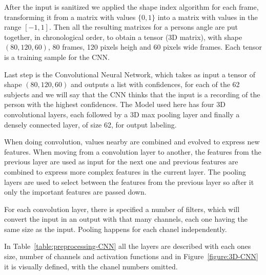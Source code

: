 \documentclass[12pt]{article}
\theoremstyle{definition}
\begin{document}
	After the input is sanitized we applied the shape index algorithm for each frame, transforming it from a matrix with values $\{0, 1\}$ into a matrix with values in the range $[-1, 1]$. Then all the resulting matrixes for a persons angle are put together, in chronological order, to obtain a tensor (3D matrix), with shape $(80, 120, 60)$, 80 frames, 120 pixels heigh and 60 pixels wide frames. Each tensor is a training sample for the CNN.

	Last step is the Convolutional Neural Network, which takes as input a tensor of shape $(80, 120, 60)$ and outputs a list with confidences, for each of the 62 subjects and we will say that the CNN thinks that the input is a recording of the person with the highest confidences.
	The Model used here has four 3D convolutional layers, each followed by a 3D max pooling layer and finally a densely connected layer, of size 62, for output labeling.

	When doing convolution, values nearby are combined and evolved to express new features. When moving from a convolution layer to another, the features from the previous layer are used as input for the next one and previous features are combined to express more complex features in the current layer. The pooling layers are used to select between the features from the previous layer so after it only the important features are passed down.

	For each convolution layer, there is specified a number of filters, which will convert the input in an output with that many channels, each one having the same size as the input. Pooling happens for each chanel independently.

	In Table~\ref{table:preprocessing-CNN} all the layers are described with each ones size, number of channels and activation functions and in Figure~\ref{figure:3D-CNN} it is visually defined, with the chanel numbers omitted.
\end{document}

